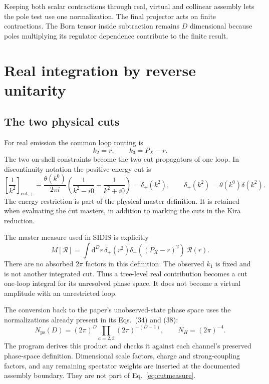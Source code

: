 \documentclass[11pt,a4paper]{article}
\newcommand{\dd}{\mathrm{d}}
\newcommand{\cut}{\mathrm{cut}}
\begin{document}
Keeping both scalar contractions through real, virtual and collinear
assembly lets the pole test use one normalization. The final projector
acts on finite contractions. The Born tensor inside subtraction remains
$D$ dimensional because poles multiplying its regulator dependence
contribute to the finite result.

\section{Real integration by reverse unitarity}
\label{sec:real}

\subsection{The two physical cuts}

For real emission the common loop routing is
\begin{equation}
 k_2=r,\qquad k_3=P_X-r.
\end{equation}
The two on-shell constraints become the two cut propagators of one loop.
In discontinuity notation the positive-energy cut is
\begin{equation}
 \left[\frac{1}{k^2}\right]_{\cut,+}
 \equiv\frac{\theta(k^0)}{2\pi i}
 \left(\frac{1}{k^2-i0}-\frac{1}{k^2+i0}\right)
 =\delta_+(k^2),\qquad
 \delta_+(k^2)=\theta(k^0)\delta(k^2).
 \label{eq:cut}
\end{equation}
The energy restriction is part of the physical master definition. It is
retained when evaluating the cut masters, in addition to marking the cuts
in the Kira reduction.

The master measure used in SIDIS is explicitly
\begin{equation}
 M[\mathcal R]=\int\dd^D r\,
 \delta_+(r^2)\delta_+((P_X-r)^2)\,\mathcal R(r).
 \label{eq:cutmeasure}
\end{equation}
There are no absorbed $2\pi$ factors in this definition. The observed $k_1$
is fixed and is not another integrated cut. Thus a tree-level real
contribution becomes a cut one-loop integral for its unresolved phase
space. It does not become a virtual amplitude with an unrestricted loop.

The conversion back to the paper's unobserved-state phase space uses the
normalizations already present in its Eqs.~(34) and (38):
\begin{equation}
 N_{\mathrm{ps}}(D)
 =(2\pi)^D\prod_{a=2,3}(2\pi)^{-(D-1)},\qquad
 N_H=(2\pi)^{-4}.
 \label{eq:normalization}
\end{equation}
The program derives this product and checks it against each channel's
preserved phase-space definition. Dimensional scale factors, charge and
strong-coupling factors, and any remaining spectator weights are inserted
at the documented assembly boundary. They are not part of
Eq.~\eqref{eq:cutmeasure}.
\end{document}

